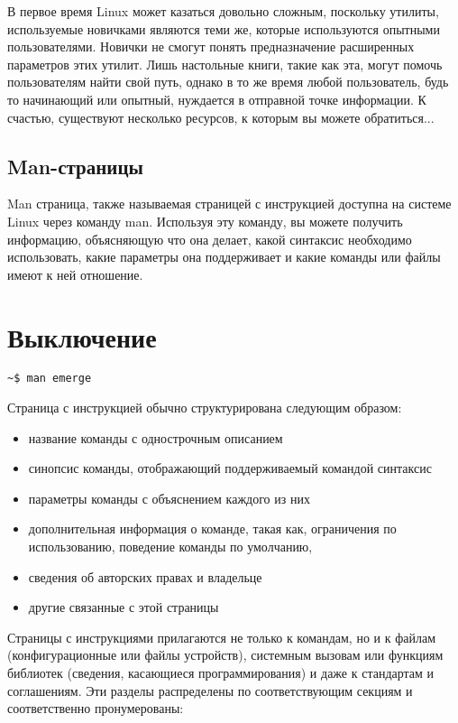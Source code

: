 \documentclass[12pt]{book}
\begin{document}
В первое время Linux может казаться довольно сложным, поскольку утилиты, используемые новичками являются теми же, которые используются опытными пользователями. Новички не смогут понять  предназначение расширенных параметров этих утилит.  Лишь настольные книги, такие как эта, могут помочь пользователям найти свой путь, однако в то же время любой пользователь, будь то начинающий или опытный, нуждается в отправной точке информации. К счастью, существуют несколько ресурсов, к которым вы можете обратиться...

\subsection{Man-страницы}

Man страница, также называемая страницей с инструкцией доступна на системе Linux через команду man. Используя эту команду, вы можете получить информацию, объясняющую что она делает, какой синтаксис необходимо использовать, какие параметры она поддерживает и какие команды или файлы имеют к ней отношение. 

\section{Выключение}

\vspace{3mm}
\begin{tcolorbox}
\begin{lstlisting}
~$ man emerge
\end{lstlisting}
\end{tcolorbox}

Страница с инструкцией обычно структурирована следующим образом:

\begin{itemize}
	\item название команды с однострочным описанием
	\item синопсис команды, отображающий поддерживаемый командой синтаксис
	\item параметры команды с объяснением каждого из них
	\item дополнительная информация о команде, такая как, ограничения по использованию, поведение команды по умолчанию, 
	\item сведения об авторских правах и владельце
	\item другие связанные с этой страницы
\end{itemize}

Страницы с инструкциями прилагаются не только к командам, но и к файлам (конфигурационные или файлы устройств), системным вызовам или функциям библиотек (сведения, касающиеся программирования) и даже к стандартам и соглашениям. Эти разделы распределены по соответствующим секциям и соответственно пронумерованы:
\end{document}
